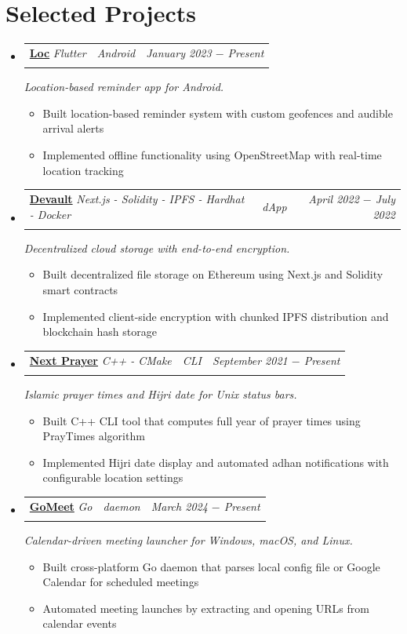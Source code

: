 \documentclass[letterpaper, 11pt]{article}
\makeatletter
\newcommand{\project}[7] {
	\vspace{-1pt}\item[]
  \begin{tabular*}{1\textwidth}[t]{ll@{\extracolsep{\fill}}r}
    #1 \href{#4}{\textbf{\color{RoyalBlue}#2}}
    \textbar{} \textit{\small#5} \textbar{ } & \textit{\footnotesize#7} & \textit{\small #3} \\
    \vspace{-8pt}
  \end{tabular*}
  \textit{\small #6}
  \vspace{-8pt}
}
\newcommand{\subproject}[1] {
\item\small
  {#1}
  \vspace{-2pt}
}
\makeatother
\begin{document}
\section{Selected Projects}
\begin{itemize}[leftmargin=0pt]
  \project
  {\faIcon{bell}}
  {Loc}{January 2023 $-$ Present}
  {https://github.com/AbdeltwabMF/loc/releases/latest}{Flutter}
  {Location-based reminder app for Android.}{Android}

  \begin{itemize}
    \subproject
    {Built location-based reminder system with custom geofences and audible arrival alerts}
    \subproject
    {Implemented offline functionality using OpenStreetMap with real-time location tracking}
  \end{itemize}\vspace{-4pt}

  \project
  {\faIcon{cloud}}
  {Devault}{April 2022 $-$ July 2022}
  {https://devault.vercel.app/}{Next.js - Solidity - IPFS - Hardhat - Docker}
  {Decentralized cloud storage with end-to-end encryption.}{dApp}

  \begin{itemize}
    \subproject
    {Built decentralized file storage on Ethereum using Next.js and Solidity smart contracts}
    \subproject
    {Implemented client-side encryption with chunked IPFS distribution and blockchain hash storage}
  \end{itemize}\vspace{-4pt}

  \project
  {\faIcon{mosque}}
  {Next Prayer}{September 2021 $-$ Present}
  {https://github.com/AbdeltwabMF/next-prayer}{C++ - CMake}
  {Islamic prayer times and Hijri date for Unix status bars.}{CLI}

  \begin{itemize}
    \subproject
    {Built C++ CLI tool that computes full year of prayer times using PrayTimes algorithm}
    \subproject
    {Implemented Hijri date display and automated adhan notifications with configurable location settings}
  \end{itemize}\vspace{-4pt}

  \project
  {\faIcon{calendar-alt}}
  {GoMeet}{March 2024 $-$ Present}
  {https://github.com/AbdeltwabMF/gomeet}{Go}
  {Calendar-driven meeting launcher for Windows, macOS, and Linux.}{daemon}

  \begin{itemize}
    \subproject
    {Built cross-platform Go daemon that parses local config file or Google Calendar for scheduled meetings}
    \subproject
    {Automated meeting launches by extracting and opening URLs from calendar events}
  \end{itemize}\vspace{-4pt}
\end{itemize}
\end{document}
